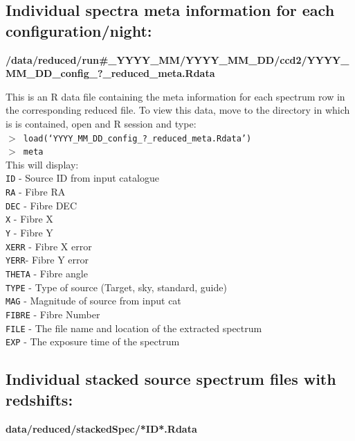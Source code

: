 \documentclass[12pt]{article}
\begin{document}
 \subsection{Individual spectra meta information for each configuration/night:} 
 
  \textbf{/data/reduced/run\#\_YYYY\_MM/YYYY\_MM\_DD/ccd2/YYYY\_MM\_DD\_config\_?\_reduced\_meta.Rdata} 
  
 This is an R data file containing the meta information for each spectrum row in the corresponding reduced file. To view this data, move to the directory in which is is contained, open and R session and type:\\
 

\hspace{10mm}  \texttt{$>$ load(`YYYY\_MM\_DD\_config\_?\_reduced\_meta.Rdata')}\\

\hspace{10mm}  \texttt{$>$ meta}\\

This will display:\\

\texttt{ID} - Source ID from input catalogue    \\
\texttt{RA} - Fibre RA \\
\texttt{DEC} - Fibre DEC \\
\texttt{X} - Fibre X \\
\texttt{Y} - Fibre Y \\
\texttt{XERR} - Fibre X error \\
\texttt{YERR}- Fibre Y error\\
\texttt{THETA} - Fibre angle \\
\texttt{TYPE} - Type of source (Target, sky, standard, guide)\\
\texttt{MAG} - Magnitude of source from input cat\\
\texttt{FIBRE} - Fibre Number\\
\texttt{FILE} - The file name and location of the extracted spectrum \\
\texttt{EXP} - The exposure time of the spectrum \\

 \subsection{Individual stacked source spectrum files with redshifts:}
 
  \textbf{data/reduced/stackedSpec/*ID*.Rdata} 
  
\end{document}
